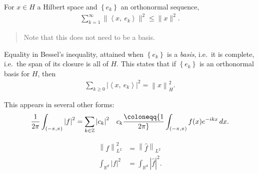 \begin{proposition}

For \(x\in H\) a Hilbert space and \(\left\{{e_k}\right\}\) an
orthonormal sequence,
\begin{align*}  
\sum_{k=1}^{\infty}\| {\left\langle {x},~{e_{k} } \right\rangle} \|^{2} \leq \|x\|^{2}
.\end{align*}

\begin{quote}
Note that this does not need to be a basis.
\end{quote}

\end{proposition}

\begin{proposition}

Equality in Bessel's inequality, attained when \(\left\{{e_k}\right\}\)
is a \emph{basis}, i.e.~it is complete, i.e.~the span of its closure is
all of \(H\). This states that if \(\left\{{e_k}\right\}\) is an
orthonormal basis for \(H\), then
\begin{align*}
\sum_{k\geq 0} {\left\lvert { {\left\langle {x},~{e_k} \right\rangle} } \right\rvert} ^2 = {\left\lVert {x} \right\rVert}_H^2
.\end{align*}

\end{proposition}

\begin{remark}

This appears in several other forms:
\begin{align*}
{1\over 2\pi} \int_{(-\pi, \pi)} {\left\lvert {f} \right\rvert}^2 = \sum_{k\in {\mathbb{Z}}} {\left\lvert {c_k} \right\rvert}^2 && c_k \coloneqq{1\over 2\pi } \int_{(-\pi, \pi)} f(x) e^{-ikx} \,dx
.\end{align*}

\end{remark}

\begin{proposition}[Plancherel]

\begin{align*}
{\left\lVert {f} \right\rVert}_{L^2}^2 &= {\left\lVert {\widehat{f}} \right\rVert}_{L^2} \\
\int_{{\mathbb{R}}^d} {\left\lvert {f} \right\rvert}^2 &= \int_{{\mathbb{R}}^d} {\left\lvert {\widehat{f}} \right\rvert}^2
.\end{align*}

\end{proposition}

